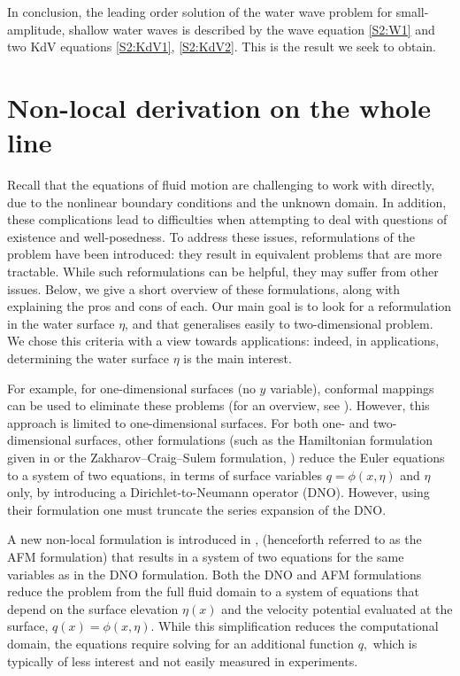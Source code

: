\documentclass[11pt,reqno,oneside,a4paper]{article}
\begin{document}
In conclusion, the leading order solution of the water wave problem for small-amplitude, shallow water waves is described by the wave equation \eqref{S2:W1} and two KdV equations \eqref{S2:KdV1}, \eqref{S2:KdV2}. This is the result we seek to obtain. 


\section{Non-local derivation on the whole line}
Recall that the equations of fluid motion are challenging to work with directly, due to the nonlinear boundary conditions and the unknown domain. In addition, these complications lead to difficulties when attempting to deal with questions of existence and well-posedness. To address these issues, reformulations of the problem have been introduced: they result in equivalent problems that are more tractable. While such reformulations can be helpful, they may suffer from other issues. Below, we give a short overview of these formulations, along with explaining the pros and cons of each. Our main goal is to look for a reformulation in the water surface $\eta$, and that generalises easily to two-dimensional problem. We chose this criteria with a view towards applications: indeed, in applications, determining the water surface $\eta$ is the main interest.

For example, for one-dimensional surfaces (no $y$ variable), conformal mappings can be used to eliminate these problems (for an overview, see \cite{DKSZ}). However, this approach is limited to one-dimensional surfaces. For both one- and two-dimensional surfaces, other formulations (such as the Hamiltonian formulation given in  \cite{Zakharov} or the Zakharov–Craig–Sulem formulation, \cite{CS1993}) reduce the Euler equations to a system of two equations, in terms of surface variables $q = \phi(x, \eta)$ and $\eta$ only, by introducing a Dirichlet-to-Neumann operator (DNO). However, using their formulation one must truncate the series expansion of the DNO.

A new non-local formulation is introduced in \cite{AFM2006}, (henceforth referred to as the AFM formulation) that results in a system of two equations for the same variables as in the DNO formulation. Both the DNO and AFM formulations reduce the problem from the full fluid domain to a system of equations that depend on the surface elevation $\eta(x)$ and the velocity potential evaluated at the surface, $q(x) = \phi(x, \eta).$ While this simplification reduces the computational domain, the equations require solving for an additional function $q,$ which is typically of less interest and not easily measured in experiments. 
\end{document}

